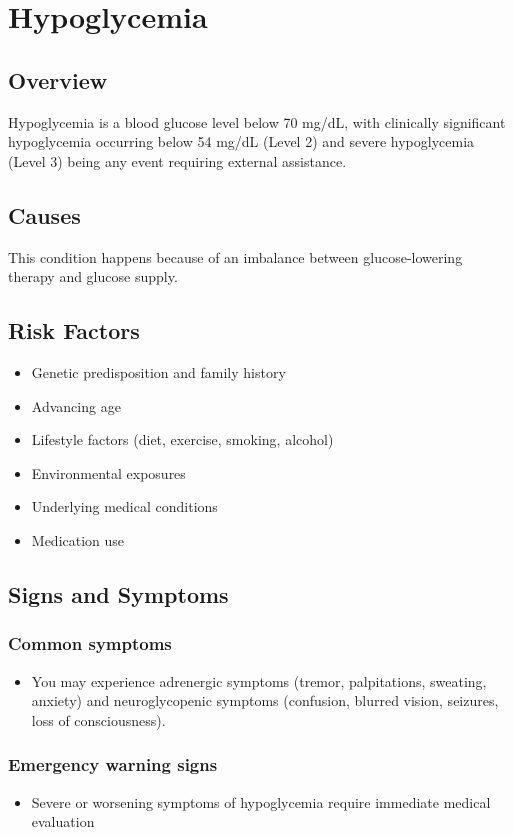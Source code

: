 \chapter{Hypoglycemia}
\label{sec:Hypoglycemia}

\section{Overview}
Hypoglycemia is a blood glucose level below 70 mg/dL, with clinically significant hypoglycemia occurring below 54 mg/dL (Level 2) and severe hypoglycemia (Level 3) being any event requiring external assistance.
\section{Causes}
This condition happens because of an imbalance between glucose-lowering therapy and glucose supply.     
\section{Risk Factors}

\begin{itemize}[noitemsep]
  \item Genetic predisposition and family history
  \item Advancing age
  \item Lifestyle factors (diet, exercise, smoking, alcohol)
  \item Environmental exposures
  \item Underlying medical conditions
  \item Medication use
\end{itemize}
\section{Signs and Symptoms}

\subsection{Common symptoms}
\begin{itemize}[noitemsep]
  \item You may experience adrenergic symptoms (tremor, palpitations, sweating, anxiety) and neuroglycopenic symptoms (confusion, blurred vision, seizures, loss of consciousness). 
  \end{itemize}

\subsection{Emergency warning signs}
\begin{itemize}[noitemsep]
  \item Severe or worsening symptoms of hypoglycemia require immediate medical evaluation
\end{itemize}
